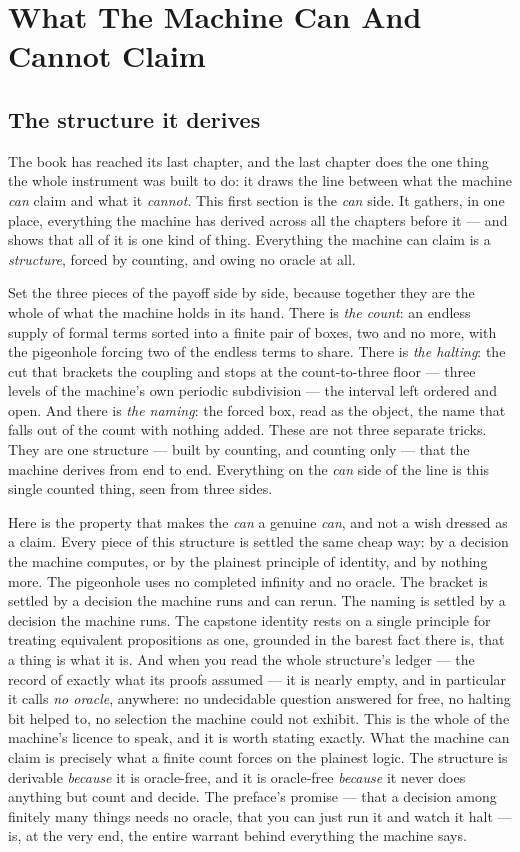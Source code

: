 \chapter{What The Machine Can And Cannot Claim}

\section{The structure it derives}

The book has reached its last chapter, and the last chapter does the one thing the whole instrument was built to do: it
draws the line between what the machine \emph{can} claim and what it \emph{cannot}. This first section is the \emph{can}
side. It gathers, in one place, everything the machine has derived across all the chapters before it --- and shows that
all of it is one kind of thing. Everything the machine can claim is a \emph{structure}, forced by counting, and owing no
oracle at all.

Set the three pieces of the payoff side by side, because together they are the whole of what the machine holds in its
hand. There is \emph{the count}: an endless supply of formal terms sorted into a finite pair of boxes, two and no more,
with the pigeonhole forcing two of the endless terms to share. There is \emph{the halting}: the cut that brackets the
coupling and stops at the count-to-three floor --- three levels of the machine's own periodic subdivision --- the
interval left ordered and open. And there is \emph{the naming}: the forced box, read as the object, the
name that falls out of the count with nothing added. These are not three separate tricks. They are one structure --- built
by counting, and counting only --- that the machine derives from end to end. Everything on the \emph{can} side of the line
is this single counted thing, seen from three sides.

Here is the property that makes the \emph{can} a genuine \emph{can}, and not a wish dressed as a claim. Every piece of
this structure is settled the same cheap way: by a decision the machine computes, or by the plainest principle of
identity, and by nothing more. The pigeonhole uses no completed infinity and no oracle. The bracket is settled by a
decision the machine runs and can rerun. The naming is settled by a decision the machine runs. The capstone identity
rests on a single principle for treating equivalent propositions as one, grounded in the barest fact there is, that a
thing is what it is. And when you read the whole structure's ledger --- the record of exactly what its proofs assumed ---
it is nearly empty, and in particular it calls \emph{no oracle}, anywhere: no undecidable question answered for free, no
halting bit helped to, no selection the machine could not exhibit. This is the whole of the machine's licence to speak,
and it is worth stating exactly. What the machine can claim is precisely what a finite count forces on the plainest
logic. The structure is derivable \emph{because} it is oracle-free, and it is oracle-free \emph{because} it never does
anything but count and decide. The preface's promise --- that a decision among finitely many things needs no oracle, that
you can just run it and watch it halt --- is, at the very end, the entire warrant behind everything the machine says.

